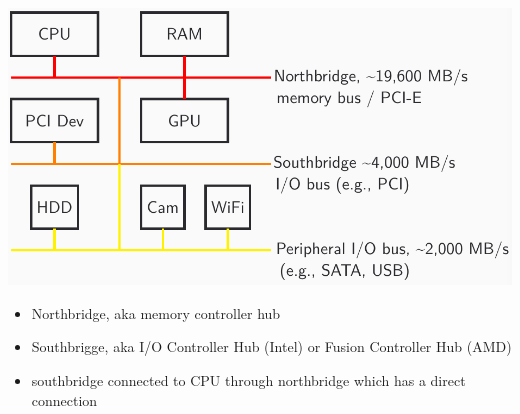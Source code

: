 \documentclass[8pt,a4paper,landscape]{extarticle}
\begin{document}
\begin{multicols*}{3}
\begin{minipage}{.65\linewidth}
\includegraphics[width=\linewidth]{imgs/otherio}
\end{minipage}
\begin{minipage}{.35\linewidth}
  \flushleft
  \begin{itemize}
  \item Northbridge, aka memory controller hub
  \item Southbrigge, aka I/O Controller Hub (Intel) or Fusion Controller Hub (AMD)
  \item southbridge connected to CPU through northbridge which has a direct connection
  \end{itemize}
\end{minipage}

\end{multicols*}
\end{document}

